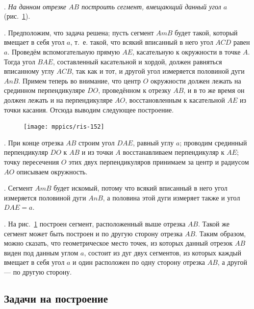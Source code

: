 \documentclass[oneside]{book}
\begin{document}

\paragraph{}\label{1938/132}
\mbox{.}
\emph{На данном отрезке $AB$ построить сегмент, вмещающий данный угол $a$} (рис.~\ref{1938/ris-152}).

\mbox{.} %
Предположим, что задача решена;
пусть сегмент $AmB$ будет такой, который вмещает в себя угол $a$, т.~е. такой, что всякий вписанный в него угол $ACD$ равен $a$.
Проведём вспомогательную прямую $AE$, касательную к окружности в точке $A$.
Тогда угол $BAE$, составленный касательной и хордой, должен равняться вписанному углу $ACB$, так как и тот, и другой угол измеряется половиной дуги $AnB$.
Примем теперь во внимание, что центр $O$ окружности должен лежать на срединном перпендикуляре $DO$, проведённом к отрезку $AB$, и в то же время он должен лежать и на перпендикуляре $AO$, восстановленным к касательной $AE$ из точки касания.
Отсюда выводим следующее построение.

\begin{figure}
\centering
\texttt{[image: mppics/ris-152]}
\caption{}\label{1938/ris-152}
\end{figure}

\mbox{.}
При конце отрезка $AB$ строим угол $DAE$, равный углу $a$;
проводим срединный перпендикуляр $DO$ к $AB$ и из точки $A$ восстанавливаем перпендикуляр к $AE$; 
точку пересечения $O$ этих двух перпендикуляров принимаем за центр и радиусом $AO$ описываем окружность.

\mbox{.}
Сегмент $AmB$ будет искомый, потому что всякий вписанный в него угол измеряется половиной дуги $AnB$, а половина этой дуги измеряет также и угол $DAE=a$.

\mbox{.}
На рис.~\ref{1938/ris-152} построен сегмент, расположенный выше отрезка $AB$.
Такой же сегмент может быть построен и по другую сторону отрезка $AB$.
Таким образом, можно сказать, что геометрическое место точек, из которых данный отрезок $AB$ виден под данным углом $a$, состоит из дуг двух сегментов, из которых каждый вмещает в себя угол $a$ и один расположен по одну сторону отрезка $AB$, а другой — по другую сторону.

\subsection*{Задачи на построение}
\end{document}
